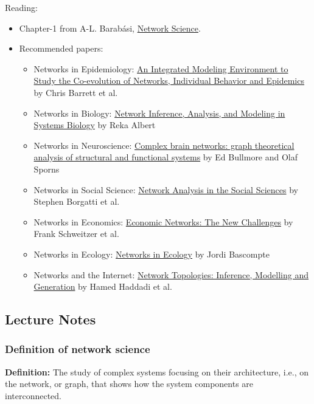 \documentclass[11pt]{scrartcl} %
\begin{document}
Reading:
\begin{itemize}
	\item Chapter-1 from A-L. Barabási, \href{http://networksciencebook.com/}{Network Science}.
	\item Recommended papers:
	\begin{itemize}
		\item Networks in Epidemiology: \href{https://www.aaai.org/ojs/index.php/aimagazine/article/view/2283}{An Integrated Modeling Environment to Study the Co-evolution of Networks, Individual Behavior and Epidemics} by Chris Barrett et al.
		\item Networks in Biology: \href{http://www.plantcell.org/content/19/11/3327.short}{Network Inference, Analysis, and Modeling in Systems Biology} by Reka Albert
		\item Networks in Neuroscience: \href{http://www.nature.com/nrn/journal/v10/n3/full/nrn2575.html}{Complex brain networks: graph theoretical analysis of structural and functional systems} by Ed Bullmore and Olaf Sporns
		\item Networks in Social Science: \href{http://citeseerx.ist.psu.edu/viewdoc/download?doi=10.1.1.226.935&rep=rep1&type=pdf}{Network Analysis in the Social Sciences} by Stephen Borgatti et al.
		\item Networks in Economics: \href{https://www.sg.ethz.ch/publications/2009/schweitzer2009economic-networks-the/}{Economic Networks: The New Challenges} by Frank Schweitzer et al.
		\item Networks in Ecology: \href{https://www.sciencedirect.com/science/article/abs/pii/S1439179107000576?via\%3Dihub}{Networks in Ecology} by Jordi Bascompte
		\item Networks and the Internet: \href{http://www.ee.ucl.ac.uk/~mrio/papers/hamedjrnl_camera.pdf}{Network Topologies: Inference, Modelling and Generation} by Hamed Haddadi et al.
	\end{itemize}
\end{itemize}

\subsection{Lecture Notes}

\subsubsection{Definition of network science}
\textbf{Definition:} The study of complex systems focusing on their architecture, i.e., on the network, or graph, that shows how the system components are interconnected.
\end{document}
